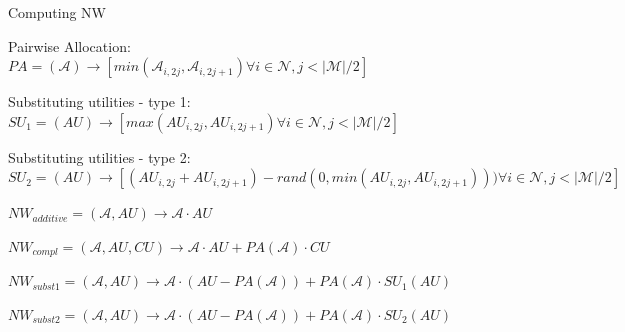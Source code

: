 \begin{algorithm}
\label{algorithm2}
\caption{ Computing NW }
\SetAlgoLined

Pairwise Allocation: \\
$ PA = (\mathcal{A}) \rightarrow [min(\mathcal{A}_{i,2j}, \mathcal{A}_{i,2j+1}) \forall i \in \mathcal{N}, j < |\mathcal{M}|/2] $

\BlankLine

Substituting utilities - type 1: \\
$ SU_1 = (AU) \rightarrow [max(AU_{i,2j}, AU_{i,2j+1}) \forall i \in \mathcal{N}, j < |\mathcal{M}|/2] $

\BlankLine

Substituting utilities - type 2: \\
$ SU_2 = (AU) \rightarrow [(AU_{i,2j} + AU_{i,2j+1}) - rand(0, min(AU_{i,2j}, AU_{i,2j+1}))) \forall i \in \mathcal{N}, j < |\mathcal{M}|/2] $

\BlankLine
\BlankLine

$ NW_{additive} = (\mathcal{A}, AU) \rightarrow \mathcal{A} \cdot AU $

$ NW_{compl} = (\mathcal{A}, AU, CU) \rightarrow \mathcal{A} \cdot AU + PA(\mathcal{A}) \cdot CU $

$ NW_{subst1} = (\mathcal{A}, AU) \rightarrow \mathcal{A} \cdot (AU - PA(\mathcal{A})) + PA(\mathcal{A}) \cdot SU_1(AU) $

$ NW_{subst2} = (\mathcal{A}, AU) \rightarrow \mathcal{A} \cdot (AU - PA(\mathcal{A})) + PA(\mathcal{A}) \cdot SU_2(AU) $

\end{algorithm}


